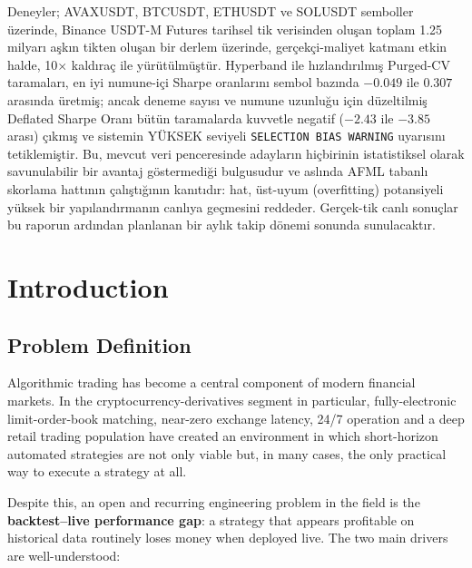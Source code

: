 \documentclass[a4paper, 12pt, titlepage]{article}
\begin{document}
Deneyler; AVAXUSDT, BTCUSDT, ETHUSDT ve SOLUSDT semboller üzerinde,
Binance USDT-M Futures tarihsel tik verisinden oluşan toplam 1.25
milyarı aşkın tikten oluşan bir derlem üzerinde, gerçekçi-maliyet
katmanı etkin halde, 10$\times$ kaldıraç ile yürütülmüştür.
Hyperband ile hızlandırılmış Purged-CV taramaları, en iyi numune-içi
Sharpe oranlarını sembol bazında $-0.049$ ile $0.307$ arasında
üretmiş; ancak deneme sayısı ve numune uzunluğu için düzeltilmiş
Deflated Sharpe Oranı bütün taramalarda kuvvetle negatif ($-2.43$
ile $-3.85$ arası) çıkmış ve sistemin YÜKSEK seviyeli
\texttt{SELECTION BIAS WARNING} uyarısını tetiklemiştir. Bu, mevcut
veri penceresinde adayların hiçbirinin istatistiksel olarak
savunulabilir bir avantaj göstermediği bulgusudur ve aslında AFML
tabanlı skorlama hattının çalıştığının kanıtıdır: hat, üst-uyum
(overfitting) potansiyeli yüksek bir yapılandırmanın canlıya
geçmesini reddeder. Gerçek-tik canlı sonuçlar bu raporun ardından
planlanan bir aylık takip dönemi sonunda sunulacaktır.

\newpage
\tableofcontents
\newpage


\section{Introduction}

\subsection{Problem Definition}

Algorithmic trading has become a central component of modern financial
markets. In the cryptocurrency-derivatives segment in particular,
fully-electronic limit-order-book matching, near-zero exchange
latency, 24/7 operation and a deep retail trading population have
created an environment in which short-horizon automated strategies
are not only viable but, in many cases, the only practical way to
execute a strategy at all.

Despite this, an open and recurring engineering problem in the field
is the \textbf{backtest--live performance gap}: a strategy that
appears profitable on historical data routinely loses money when
deployed live. The two main drivers are well-understood:
\end{document}
